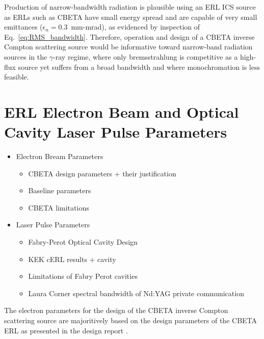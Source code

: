 \documentclass[../main.tex]{subfiles}
\begin{document}
 Production of narrow-bandwidth radiation is plausible using an ERL ICS source as ERLs such as CBETA have small energy spread and are capable of very small emittances ($\epsilon_{n} = 0.3$~\si{\milli\meter}-\si{\milli\radian}), as evidenced by inspection of Eq.~\ref{eq:RMS_bandwidth}. Therefore, operation and design of a CBETA inverse Compton scattering source would be informative toward narrow-band radiation sources in the $\gamma$-ray regime, where only bremsstrahlung is competitive as a high-flux source yet suffers from a broad bandwidth and where monochromation is less feasible. 

\section{ERL Electron Beam and Optical Cavity Laser Pulse Parameters}

\begin{itemize}
\item{Electron Bream Parameters}
    \begin{itemize}
    \item{CBETA design parameters + their justification}
    \item{Baseline parameters}
    \item{CBETA limitations}
    \end{itemize}
\item{Laser Pulse Parameters}
    \begin{itemize}
    \item{Fabry-Perot Optical Cavity Design}
    \item{KEK cERL results + cavity}
    \item{Limitations of Fabry Perot cavities}
    \item{Laura Corner spectral bandwidth of Nd:YAG private communication}
    \end{itemize}
\end{itemize}

The electron parameters for the design of the CBETA inverse Compton scattering source are majoritively based on the design parameters of the CBETA ERL as presented in the design report \cite{hoffstaetter2017cbeta}.
\end{document}
